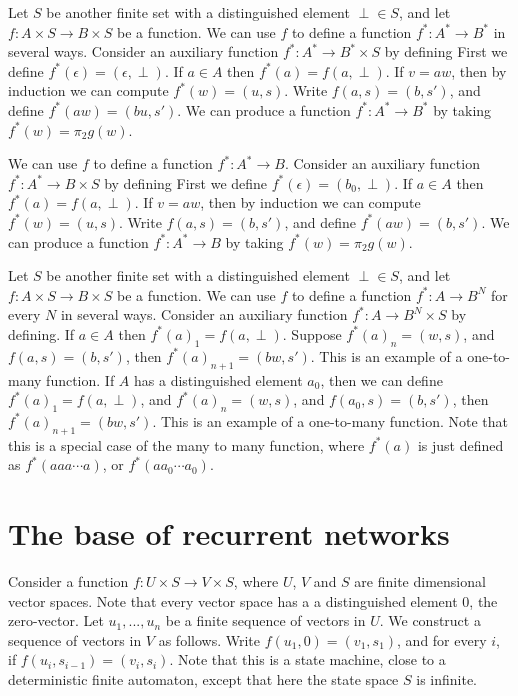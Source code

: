 \documentclass[10pt]{amsart}
\theoremstyle{definition}
\begin{document}
Let $S$ be another finite set with a distinguished element $\perp\in S$, and let $f:A\times S\to B\times S$ be a function. We can use $f$ to define a function $f^*:A^*\to B^*$ in several ways. Consider an auxiliary function $f^*:A^*\to B^*\times S$ by defining First we define $f^*(\epsilon)=(\epsilon, \perp)$. If $a\in A$ then $f^*(a)=f(a, \perp)$. If $v=aw$, then by induction we can compute $f^*(w)=(u, s)$. Write $f(a, s)=(b, s')$, and define $f^*(aw)=(bu, s')$.  We can produce a function $f^*:A^*\to B^*$ by taking $f^*(w)=\pi_2 g(w)$.

We can use $f$ to define a function $f^*:A^*\to B$. Consider an auxiliary function $f^*:A^*\to B\times S$ by defining First we define $f^*(\epsilon)=(b_0, \perp)$. If $a\in A$ then $f^*(a)=f(a, \perp)$. If $v=aw$, then by induction we can compute $f^*(w)=(u, s)$. Write $f(a, s)=(b, s')$, and define $f^*(aw)=(b, s')$.  We can produce a function $f^*:A^*\to B$ by taking $f^*(w)=\pi_2 g(w)$.

Let $S$ be another finite set with a distinguished element $\perp\in S$, and let $f:A\times S\to B\times S$ be a function. We can use $f$ to define a function $f^*:A\to B^N$ for every $N$ in several ways. Consider an auxiliary function $f^*:A\to B^N\times S$ by defining. If $a\in A$ then $f^*(a)_1=f(a, \perp)$. Suppose $f^*(a)_n=(w, s)$, and  $f(a, s) = (b, s')$, then $f^*(a)_{n+1}=(bw, s')$.  This is an example of a one-to-many function. If $A$ has a distinguished element $a_0$, then we can define $f^*(a)_1=f(a, \perp)$, and $f^*(a)_n=(w, s)$, and  $f(a_0, s) = (b, s')$, then $f^*(a)_{n+1}=(bw, s')$.  This is an example of a one-to-many function.  Note that this is a special case of the many to many function, where $f^*(a)$ is just defined as $f^*(aaa\cdots a)$, or $f^*(aa_0\cdots a_0)$.


%
%




\section{The base of recurrent networks}

Consider a function $f:U\times S\to V\times S$, where $U$, $V$ and $S$ are finite dimensional vector spaces.
Note that every vector space has a a distinguished element $0$, the zero-vector.  Let $u_1,...,u_n$ be a finite
sequence of vectors in $U$.  We construct a sequence of vectors in $V$ as follows. Write $f(u_1, 0)=(v_1, s_1)$,
and for every $i$, if $f(u_{i}, s_{i-1})=(v_i, s_i)$. Note that this is a state machine, close to a
deterministic finite automaton, except that here the state space $S$ is infinite.
\end{document}
